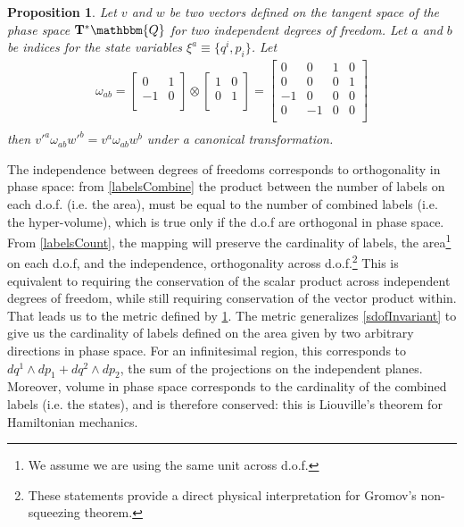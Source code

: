 \documentclass[aps,pra,10pt,twocolumn,floatfix,nofootinbib]{revtex4-1}
\newtheorem{prop}[thm]{Proposition}
\theoremstyle{definition}
\begin{document}
\begin{prop}\label{mdofInvariant}
Let $v$ and $w$ be two vectors defined on the tangent space of the phase space $\mathbf{T}^*\mathbbm{Q}$ for two independent degrees of freedom. Let $a$ and $b$ be indices for the state variables $\xi^a\equiv \{q^i, p_i\}$. Let
\begin{align*}
\omega_{ab} =  \left[
  \begin{array}{cc}
    0 & 1 \\
    -1 & 0 \\
  \end{array}
\right] \otimes \left[
  \begin{array}{cc}
    1 & 0 \\
    0 & 1 \\
  \end{array}
\right] =
\left[
  \begin{array}{cccc}
    0 & 0 & 1 & 0 \\
    0 & 0 & 0 & 1 \\
    -1 & 0 & 0 & 0 \\
    0 & -1 & 0 & 0 \\
  \end{array}
\right] \\
\end{align*}
then $v'^{a} \omega_{a b} w'^{b}=v^{a} \omega_{ab} w^{b}$ under a canonical transformation.
\end{prop}

The independence between degrees of freedoms corresponds to orthogonality in phase space: from \ref{labelsCombine} the product between the number of labels on each d.o.f. (i.e. the area), must be equal to the number of combined labels (i.e. the hyper-volume), which is true only if the d.o.f are orthogonal in phase space. From \ref{labelsCount}, the mapping will preserve the cardinality of labels, the area\footnote{We assume we are using the same unit across d.o.f.} on each d.o.f, and the independence, orthogonality across d.o.f.\footnote{These statements provide a direct physical interpretation for Gromov's non-squeezing theorem\cite{Gromov,deGosson,Stewart}.} This is equivalent to requiring the conservation of the scalar product across independent degrees of freedom, while still requiring conservation of the vector product within. That leads us to the metric defined by \ref{mdofInvariant}.
The metric generalizes \ref{sdofInvariant} to give us the cardinality of labels defined on the area given by two arbitrary directions in phase space. For an infinitesimal region, this corresponds to $dq^1 \wedge dp_1 + dq^2 \wedge dp_2$, the sum of the projections on the independent planes. Moreover, volume in phase space corresponds to the cardinality of the combined labels (i.e. the states), and is therefore conserved: this is Liouville's theorem for Hamiltonian mechanics.
\end{document}
